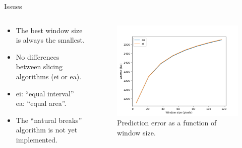 \documentclass[10pt,table,dvipsnames,compress]{beamer}
\begin{document}
\begin{frame}[label={sec:org54ca8f7}]{Issues}
\begin{columns}
\begin{column}{0.5\columnwidth}
\begin{itemize}
\item The best window size is always the smallest.
\item No differences between slicing algorithms (ei or ea).
\item ei: ``equal interval''\\
ea: ``equal area''.
\item The ``natural breaks'' algorithm is not yet implemented.
\end{itemize}
\end{column}

\begin{column}{0.5\columnwidth}
\begin{figure}[htbp]
\centering
\includegraphics[width=\textwidth]{figs/map_comp.png}
\caption{\label{fig:org3ea48de}Prediction error as a function of window size.}
\end{figure}
\end{column}
\end{columns}
\end{frame}
\end{document}
